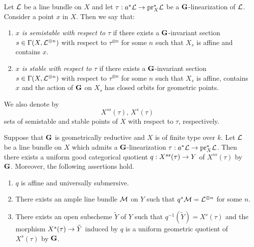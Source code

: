 \begin{definition}
Let ${\mathcal L}$ be a line bundle on $X$ and let $\tau:a^*{\mathcal L}\rightarrow \mathrm{pr}_X^*{\mathcal L}$ be a $\mathbf{G}$-linearization of ${\mathcal L}$. Consider a point $x$ in $X$. Then we say that:
\begin{enumerate}[label=\textbf{(\arabic*)}, leftmargin=3.0em]
\item \textit{$x$ is semistable with respect to $\tau$} if there exists a $\mathbf{G}$-invariant section $s\in \Gamma(X,{\mathcal L}^{\otimes n})$ with respect to $\tau^{\otimes n}$ for some $n$ such that $X_s$ is affine and contains $x$.
\item \textit{$x$ is stable with respect to $\tau$} if there exists a $\mathbf{G}$-invariant section $s\in \Gamma(X,{\mathcal L}^{\otimes n})$ with respect to $\tau^{\otimes n}$ for some $n$ such that $X_s$ is affine, contains $x$ and the action of $\mathbf{G}$ on $X_s$ has closed orbits for geometric points.
\end{enumerate}
We also denote by
$$X^{ss}\left(\tau\right),\,X^s\left(\tau\right)$$
sets of semistable and stable points of $X$ with respect to $\tau$, respectively.
\end{definition}

\begin{theorem}
Suppose that $\mathbf{G}$ is geometrically reductive and $X$ is of finite type over $k$. Let ${\mathcal L}$ be a line bundle on $X$ which admits a $\mathbf{G}$-linearization $\tau:a^*{\mathcal L}\rightarrow \mathrm{pr}^*_X{\mathcal L}$. Then there exists a uniform good categorical quotient $q:X^{ss}(\tau)\rightarrow Y$ of $X^{ss}(\tau)$ by $\mathbf{G}$. Moreover, the following assertions hold.
\begin{enumerate}[label=\emph{\textbf{(\arabic*)}}, leftmargin=3.0em]
\item $q$ is affine and universally submersive.
\item There exists an ample line bundle ${\mathcal M}$ on $Y$ such that $q^*{\mathcal M} = {\mathcal L}^{\otimes n}$ for some $n$.
\item There exists an open subscheme $\tilde{Y}$ of $Y$ such that $q^{-1}(\tilde{Y}) = X^s(\tau)$ and the morphism $X^s(\tau)\rightarrow \tilde{Y}$ induced by $q$ is a uniform geometric quotient of $X^s(\tau)$ by $\mathbf{G}$.
\end{enumerate}

\end{theorem}






\small



    


